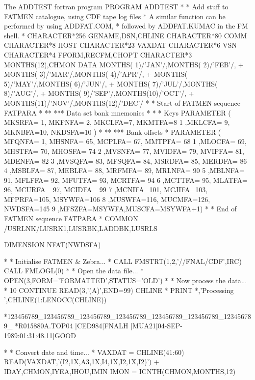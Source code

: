 \begin{XMPt}{The ADDTEST fortran program}
      PROGRAM ADDTEST
*
*     Add stuff to FATMEN catalogue, using CDF tape log files
*     A similar function can be performed by using ADDFAT.COM,
*     followed by ADDFAT.KUMAC in the FM shell.
*
      CHARACTER*256 GENAME,DSN,CHLINE
      CHARACTER*80  COMM
      CHARACTER*8   HOST
      CHARACTER*23  VAXDAT
      CHARACTER*6   VSN
      CHARACTER*4   FFORM,RECFM,CHOPT
      CHARACTER*3   MONTHS(12),CHMON
      DATA          MONTHS( 1)/'JAN'/,MONTHS( 2)/'FEB'/,
     +              MONTHS( 3)/'MAR'/,MONTHS( 4)/'APR'/,
     +              MONTHS( 5)/'MAY'/,MONTHS( 6)/'JUN'/,
     +              MONTHS( 7)/'JUL'/,MONTHS( 8)/'AUG'/,
     +              MONTHS( 9)/'SEP'/,MONTHS(10)/'OCT'/,
     +              MONTHS(11)/'NOV'/,MONTHS(12)/'DEC'/
*
* Start of FATMEN sequence FATPARA
*
** ***     Data set bank mnemonics
*
*
*          Keys
      PARAMETER ( MKSRFA= 1, MKFNFA= 2, MKCLFA=7, MKMTFA=8
     1           ,MKLCFA= 9, MKNBFA=10, NKDSFA=10 )
*
** ***     Bank offsets
*
      PARAMETER ( MFQNFA=  1, MHSNFA= 65, MCPLFA= 67, MMTPFA= 68
     1           ,MLOCFA= 69, MHSTFA= 70, MHOSFA= 74
     2           ,MVSNFA= 77, MVIDFA= 79, MVIPFA= 81, MDENFA= 82
     3           ,MVSQFA= 83, MFSQFA= 84, MSRDFA= 85, MERDFA= 86
     4           ,MSBLFA= 87, MEBLFA= 88, MRFMFA= 89, MRLNFA= 90
     5           ,MBLNFA= 91, MFLFFA= 92, MFUTFA= 93, MCRTFA= 94
     6           ,MCTTFA= 95, MLATFA= 96, MCURFA= 97, MCIDFA= 99
     7           ,MCNIFA=101, MCJIFA=103, MFPRFA=105, MSYWFA=106
     8           ,MUSWFA=116, MUCMFA=126, NWDSFA=145
     9           ,MFSZFA=MSYWFA,MUSCFA=MSYWFA+1)
*
* End of FATMEN sequence FATPARA
*
      COMMON /USRLNK/LUSRK1,LUSRBK,LADDBK,LUSRLS

      DIMENSION     NFAT(NWDSFA)

*
*     Initialise FATMEN & Zebra...
*
      CALL FMSTRT(1,2,'//FNAL/CDF',IRC)
      CALL FMLOGL(0)
*
*     Open the data file...
*
      OPEN(3,FORM='FORMATTED',STATUS='OLD')
*
*     Now process the data...
*
10    CONTINUE
      READ(3,'(A)',END=99) CHLINE
*     PRINT *,'Processing ',CHLINE(1:LENOCC(CHLINE))

*123456789_123456789_123456789_123456789_123456789_123456789_123456789_
*R015880A.TOP04   |CED984|FNALH   |MUA21|04-SEP-1989:01:31:48.11|GOOD

*
*     Convert date and time...
*
      VAXDAT = CHLINE(41:60)
      READ(VAXDAT,'(I2,1X,A3,1X,I4,1X,I2,1X,I2)') 
     +     IDAY,CHMON,IYEA,IHOU,IMIN
      IMON   = ICNTH(CHMON,MONTHS,12)


\end{XMPt}
